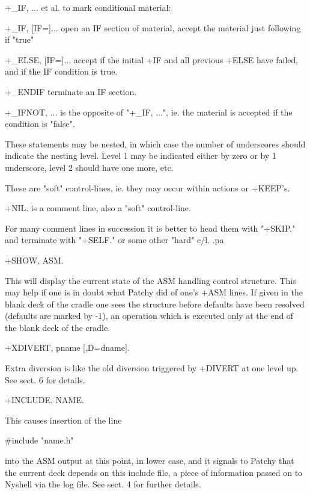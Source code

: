 \item
+_IF, ... et al.  to mark conditional material:

      +_IF, [IF=]...     open an IF section of material, accept the
                         material just following if "true"

      +_ELSE, [IF=]...   accept if the initial +IF and all previous +ELSE
                         have failed, and if the IF condition is true.

      +_ENDIF            terminate an IF section.

      +_IFNOT, ...       is the opposite of "+_IF, ...", ie. the material
                         is accepted if the condition is "false".

These statements may be nested, in which case the number of underscores
should indicate the nesting level. Level 1 may be indicated either
by zero or by 1 underscore, level 2 should have one more, etc.

These are "soft" control-lines, ie. they may occur within actions
or +KEEP's.


\item
+NIL.   is a comment line, also a "soft" control-line.

For many comment lines in succession it is better to head them with
"+SKIP." and terminate with "+SELF." or some other "hard" c/l.
.pa


\item
+SHOW, ASM.

This will display the current state of the ASM handling control structure.
This may help if one is in doubt what Patchy did of one's +ASM lines.
If given in the blank deck of the cradle one sees the structure before
defaults have been resolved (defaults are marked by -1), an operation
which is executed only at the end of the blank deck of the cradle.


\item
+XDIVERT, pname [,D=dname].

Extra diversion is like the old diversion triggered by +DIVERT at
one level up. See sect. 6 for details.


\item
+INCLUDE, NAME.

This causes insertion of the line

      #include "name.h"

into the ASM output at this point, in lower case, and it signals to
Patchy that the current deck depends on this include file, a piece
of information passed on to Nyshell via the log file. See sect. 4 for
further details.


